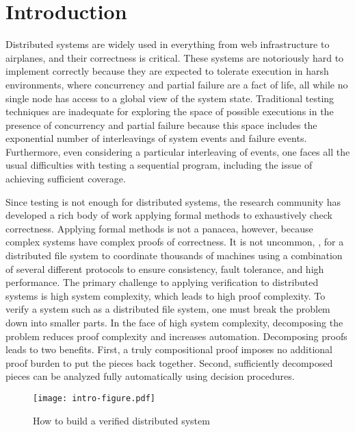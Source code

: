 \chapter{Introduction}
\label{chap:intro}

Distributed systems are widely used
  in everything from web infrastructure to airplanes,
  and their correctness is critical.
These systems are notoriously hard to implement correctly
  because they are expected to tolerate execution in harsh environments,
  where concurrency and partial failure are a fact of life,
  all while no single node has access to a global view of the system state.
Traditional testing techniques are inadequate
  for exploring the space of possible executions
  in the presence of concurrency and partial failure
  because this space includes the exponential number of
  interleavings of system events and failure events.
Furthermore, even considering a particular interleaving of events,
  one faces all the usual difficulties with testing a sequential program,
  including the issue of achieving sufficient coverage.

Since testing is not enough for distributed systems,
  the research community has developed
  a rich body of work applying formal methods
  to exhaustively check correctness.
Applying formal methods is not a panacea, however,
  because complex systems have complex proofs of correctness.
It is not uncommon, \eg,
  for a  distributed file system to coordinate thousands of machines
  using a combination of several different protocols to ensure
  consistency, fault tolerance, and high performance.
The primary challenge to applying verification to distributed systems is
  high system complexity, which leads to high proof complexity.
To verify a system such as a distributed file system,
  one must break the problem down into smaller parts.
In the face of high system complexity,
  decomposing the problem reduces proof complexity and increases automation.
Decomposing proofs leads to two benefits.
First, a truly compositional proof
  imposes no additional proof burden
  to put the pieces back together.
Second, sufficiently decomposed pieces can
  be analyzed fully automatically using decision procedures.

\begin{figure}[t]
  \centering
  \texttt{[image: intro-figure.pdf]}
  \caption{How to build a verified distributed system}
  \label{fig:intro}
\end{figure}


